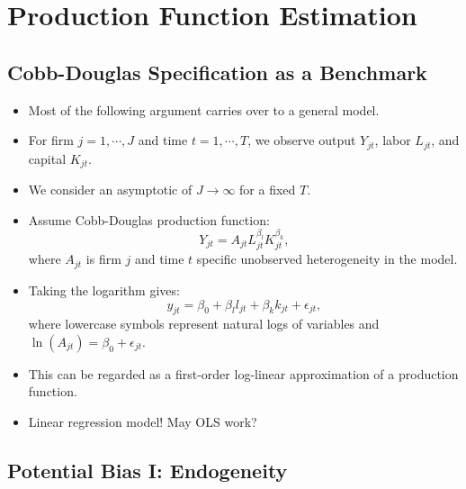 \documentclass[
]{book}
\providecommand{\tightlist}{%
  \setlength{\itemsep}{0pt}\setlength{\parskip}{0pt}}
\begin{document}
\hypertarget{production-function-estimation}{%
\section{Production Function Estimation}\label{production-function-estimation}}

\hypertarget{cobb-douglas-specification-as-a-benchmark}{%
\subsection{Cobb-Douglas Specification as a Benchmark}\label{cobb-douglas-specification-as-a-benchmark}}

\begin{itemize}
\tightlist
\item
  Most of the following argument carries over to a general model.
\item
  For firm \(j = 1, \cdots, J\) and time \(t = 1, \cdots, T\), we observe output \(Y_{jt}\), labor \(L_{jt}\), and capital \(K_{jt}\).
\item
  We consider an asymptotic of \(J \to \infty\) for a fixed \(T\).
\item
  Assume Cobb-Douglas production function:
  \begin{equation}
  Y_{jt} = A_{jt}  L_{jt}^{\beta_l} K_{jt}^{\beta_k},
  \end{equation}
  where \(A_{jt}\) is firm \(j\) and time \(t\) specific unobserved heterogeneity in the model.
\item
  Taking the logarithm gives:
  \begin{equation}
  y_{jt} = \beta_0 + \beta_l l_{jt} + \beta_k k_{jt} + \epsilon_{jt},
  \end{equation}
  where lowercase symbols represent natural logs of variables and \(\ln(A_{jt}) = \beta_0 + \epsilon_{jt}\).
\item
  This can be regarded as a first-order log-linear approximation of a production function.
\item
  Linear regression model! May OLS work?
\end{itemize}

\hypertarget{potential-bias-i-endogeneity}{%
\subsection{Potential Bias I: Endogeneity}\label{potential-bias-i-endogeneity}}
\end{document}
